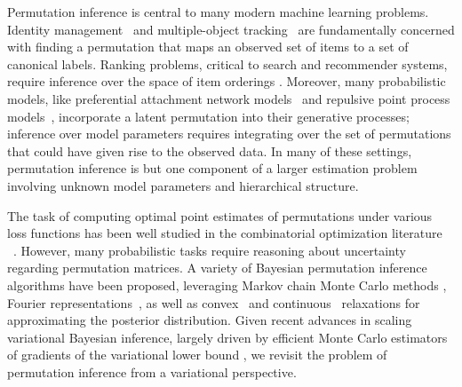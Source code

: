 Permutation inference is central to many modern machine learning
problems.  Identity management~\citep{guibas2008identity} and
multiple-object tracking~\citep{shin2005lazy, kondor2007multi} are
fundamentally concerned with finding a permutation that maps an
observed set of items to a set of canonical labels.
Ranking problems, critical to search and recommender systems, require
inference over the space of item orderings \citep{meilua2007consensus,
  lebanon2008non, adams2011ranking}.  Moreover, many probabilistic models, like
preferential attachment network models~\citep{bloem2016random} and
repulsive point process models~\citep{rao2016bayesian}, incorporate a
latent permutation into their generative processes; inference over
model parameters requires integrating over the set of permutations
that could have given rise to the observed data.  In many of these
settings, permutation inference is but one component of a larger
estimation problem involving unknown model parameters and hierarchical
structure.

The task of computing optimal point estimates of permutations under
various loss functions has been well studied
in the combinatorial optimization literature ~\citep{kuhn1955hungarian, munkres1957algorithms,
  lawler1963quadratic}. However, many probabilistic tasks require reasoning
about uncertainty regarding permutation matrices.  A variety of
Bayesian permutation inference algorithms have been proposed, leveraging
Markov chain Monte Carlo methods \citep{diaconis1988group}, Fourier
representations~\citep{kondor2007multi, huang2009fourier}, as well as
convex~\citep{lim2014beyond} and
continuous~\citep{plis2011directional} relaxations for approximating
the posterior distribution.  Given recent advances in scaling
variational Bayesian inference, largely driven by efficient Monte
Carlo estimators of gradients of the variational lower bound
\citep{Kingma2014, rezende2014stochastic}, we revisit the problem of
permutation inference from a variational perspective.

